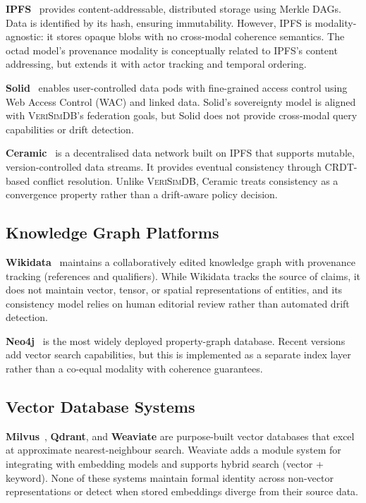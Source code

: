 \documentclass[11pt,twocolumn]{article}
\newcommand{\verisimdb}{\textsc{VeriSimDB}\xspace}
\begin{document}
\textbf{IPFS}~\cite{benet2014ipfs} provides content-addressable, distributed
storage using Merkle DAGs.  Data is identified by its hash, ensuring
immutability.  However, IPFS is modality-agnostic: it stores opaque blobs
with no cross-modal coherence semantics.  The octad model's provenance
modality is conceptually related to IPFS's content addressing, but extends
it with actor tracking and temporal ordering.

\textbf{Solid}~\cite{sambra2016solid} enables user-controlled data pods with
fine-grained access control using Web Access Control (WAC) and linked data.
Solid's sovereignty model is aligned with \verisimdb's federation goals, but
Solid does not provide cross-modal query capabilities or drift detection.

\textbf{Ceramic}~\cite{ceramic2023} is a decentralised data network built on
IPFS that supports mutable, version-controlled data streams.  It provides
eventual consistency through CRDT-based conflict resolution.  Unlike
\verisimdb, Ceramic treats consistency as a convergence property rather than
a drift-aware policy decision.

\subsection{Knowledge Graph Platforms}

\textbf{Wikidata}~\cite{vrandecic2014wikidata} maintains a collaboratively
edited knowledge graph with provenance tracking (references and qualifiers).
While Wikidata tracks the source of claims, it does not maintain vector,
tensor, or spatial representations of entities, and its consistency model
relies on human editorial review rather than automated drift detection.

\textbf{Neo4j}~\cite{neo4j2023} is the most widely deployed property-graph
database.  Recent versions add vector search capabilities, but this is
implemented as a separate index layer rather than a co-equal modality with
coherence guarantees.

\subsection{Vector Database Systems}

\textbf{Milvus}~\cite{wang2021milvus}, \textbf{Qdrant}, and \textbf{Weaviate}
are purpose-built vector databases that excel at approximate nearest-neighbour
search.  Weaviate adds a module system for integrating with embedding models
and supports hybrid search (vector + keyword).  None of these systems maintain
formal identity across non-vector representations or detect when stored
embeddings diverge from their source data.
\end{document}
